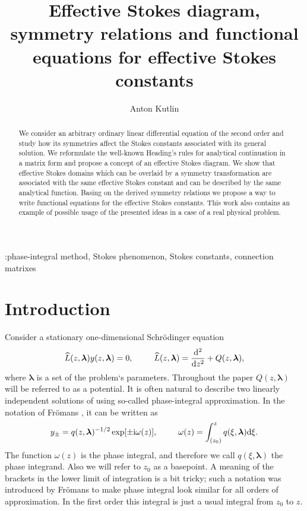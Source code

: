 \documentclass[12pt]{iopart}
\def\L{\widehat{L}}
\def\lmbd{\bm{\lambda}}
\def\w{\omega}
\newcommand\phsintgrnd[1][z]{q(#1,\lmbd)}
\newcommand\predexp[1][z]{q(#1,\lmbd)^{-1/2}}
\newcommand\phsintgrl[3][z]{\int_{#2}^{#3} \phsintgrnd[#1] \rmd #1}
\begin{document}
\title[Effective Stokes diagram and symmetry relations for effective Stokes constants]{Effective Stokes diagram, symmetry relations and functional equations for effective Stokes constants}
\author{Anton Kutlin}

\address{Institute of Applied Physics of Russian Academy of Sciences, 46 Ulyanov str., 603950 Nizhny Novgorod, Russia}



\begin{abstract}
We consider an arbitrary ordinary linear differential equation of the second order and study 
how its symmetries affect the Stokes constants associated with its general solution. 
We reformulate the well-known Heading's rules for analytical continuation in a matrix form 
and propose a concept of an effective Stokes diagram. We show that effective Stokes 
domains which can be overlaid by a symmetry transformation are associated with the same 
effective Stokes constant and can be described by the same analytical function. Basing on
the derived symmetry relations we propose a way to write functional equations for 
the effective Stokes constants. This work also contains an example of possible usage 
of the presented ideas in a case of a real physical problem.
\end{abstract}

\submitto{\jpa}

:phase-integral method, Stokes phenomenon, Stokes constants, connection matrixes


\section{Introduction \label{sec:intro}}
Consider a stationary one-dimensional Schr\"odinger equation
\begin{eqnarray}
\L(z,\lmbd)y(z,\lmbd)=0, \qquad \L(z,\lmbd)=\frac{\rmd^2}{\rmd z^2} + Q(z,\lmbd),   \label{eq:gen}
\end{eqnarray}
where $\lmbd$ is a set of the problem`s parameters. Throughout the paper 
\mbox{$Q(z,\lmbd)$} will be referred to as a potential. It is often natural to describe two 
linearly independent solutions of  using so-called phase-integral 
approximation. In the notation of Fr\"omans \cite{frbook}, it can be written as
\begin{eqnarray}
y_\pm = \predexp \exp [\pm \rmi \w(z)], \qquad \w(z)=\phsintgrl[\xi]{(z_0)}{z}.   \label{eq:phsint}
\end{eqnarray}
The function $\w(z)$ is the phase integral, and therefore we call $\phsintgrnd[\xi]$ 
the phase integrand. Also we will refer to $z_0$ as a basepoint. A meaning of the brackets in the 
lower limit of integration is a bit tricky; such a notation was introduced by Fr\"omans \cite{frpaper} to make
phase integral look similar for all orders of approximation. In the first order this integral is just
a usual integral from $z_0$ to $z$. 
\end{document}
